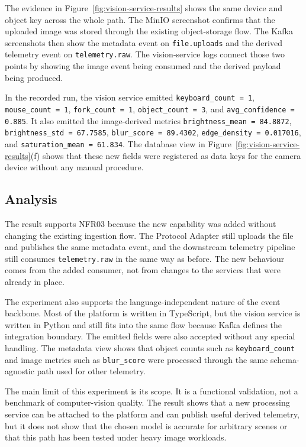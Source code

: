 The evidence in Figure~\ref{fig:vision-service-results} shows the same device and object key across the whole path. The MinIO screenshot confirms that the uploaded image was stored through the existing object-storage flow. The Kafka screenshots then show the metadata event on \texttt{file.uploads} and the derived telemetry event on \texttt{telemetry.raw}. The vision-service logs connect those two points by showing the image event being consumed and the derived payload being produced.

In the recorded run, the vision service emitted \texttt{keyboard\_count = 1}, \texttt{mouse\_count = 1}, \texttt{fork\_count = 1}, \texttt{object\_count = 3}, and \texttt{avg\_confidence = 0.885}. It also emitted the image-derived metrics \texttt{brightness\_mean = 84.8872}, \texttt{brightness\_std = 67.7585}, \texttt{blur\_score = 89.4302}, \texttt{edge\_density = 0.017016}, and \texttt{saturation\_mean = 61.834}. The database view in Figure~\ref{fig:vision-service-results}(f) shows that these new fields were registered as data keys for the camera device without any manual procedure.

\subsection{Analysis}
\label{subsec:EvalExtensibilityAnalysis}

The result supports NFR03 because the new capability was added without changing the existing ingestion flow. The Protocol Adapter still uploads the file and publishes the same metadata event, and the downstream telemetry pipeline still consumes \texttt{telemetry.raw} in the same way as before. The new behaviour comes from the added consumer, not from changes to the services that were already in place.

The experiment also supports the language-independent nature of the event backbone. Most of the platform is written in TypeScript, but the vision service is written in Python and still fits into the same flow because Kafka defines the integration boundary. The emitted fields were also accepted without any special handling. The metadata view shows that object counts such as \texttt{keyboard\_count} and image metrics such as \texttt{blur\_score} were processed through the same schema-agnostic path used for other telemetry.

The main limit of this experiment is its scope. It is a functional validation, not a benchmark of computer-vision quality. The result shows that a new processing service can be attached to the platform and can publish useful derived telemetry, but it does not show that the chosen model is accurate for arbitrary scenes or that this path has been tested under heavy image workloads.


